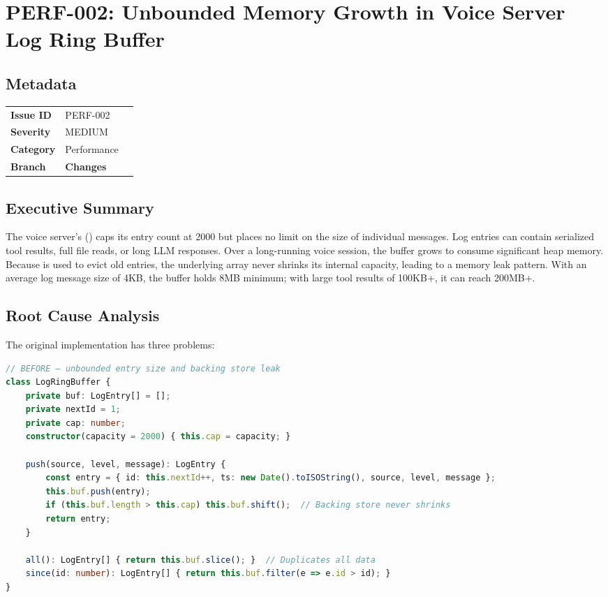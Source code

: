 \section{PERF-002: Unbounded Memory Growth in Voice Server Log Ring Buffer}
\label{sec:perf-002}
\subsection*{Metadata}
\begin{tabular}{ll}
\textbf{Issue ID} & PERF-002 \\
\textbf{Severity} & MEDIUM \\
\textbf{Category} & Performance \\
\textbf{Branch} & 
\textbf{Changes} &  \\
\end{tabular}

\subsection*{Executive Summary}
The voice server's  () caps its entry count at 2000 but places no limit on the size of individual messages. Log entries can contain serialized tool results, full file reads, or long LLM responses. Over a long-running voice session, the buffer grows to consume significant heap memory. Because  is used to evict old entries, the underlying array never shrinks its internal capacity, leading to a memory leak pattern. With an average log message size of 4KB, the buffer holds 8MB minimum; with large tool results of 100KB+, it can reach 200MB+.

\subsection*{Root Cause Analysis}
The original implementation has three problems:

\begin{lstlisting}[language=TypeScript]
// BEFORE — unbounded entry size and backing store leak
class LogRingBuffer {
    private buf: LogEntry[] = [];
    private nextId = 1;
    private cap: number;
    constructor(capacity = 2000) { this.cap = capacity; }

    push(source, level, message): LogEntry {
        const entry = { id: this.nextId++, ts: new Date().toISOString(), source, level, message };
        this.buf.push(entry);
        if (this.buf.length > this.cap) this.buf.shift();  // Backing store never shrinks
        return entry;
    }

    all(): LogEntry[] { return this.buf.slice(); }  // Duplicates all data
    since(id: number): LogEntry[] { return this.buf.filter(e => e.id > id); }
}
\end{lstlisting}

